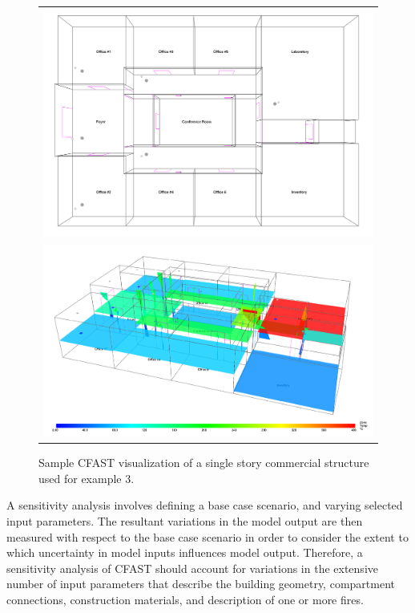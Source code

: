 \documentclass[12pt,twoside]{book}
\begin{document}
\begin{figure}[!ht]
\centering
\begin{tabular*}{\textwidth}{c}
\includegraphics[width=6.0in]{FIGURES/Sensitivity.png} \\
\includegraphics[width=6.0in]{FIGURES/Sensitivity_Running.png}
\end{tabular*}
\caption{Sample CFAST visualization of a single story commercial structure used for example 3.}
\label{sensitivity_geometry}
\end{figure}

A sensitivity analysis involves defining a base case scenario, and varying selected input parameters. The resultant variations in the model output are then measured with respect to the base case scenario in order to consider the extent to which uncertainty in model inputs influences model output. Therefore, a sensitivity analysis of CFAST should account for variations in the extensive number of input parameters that describe the building geometry, compartment connections, construction materials, and description of one or more fires.
\end{document}
